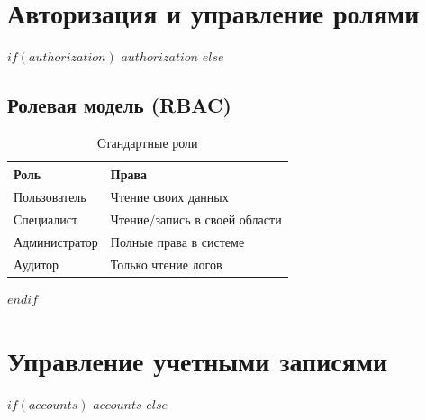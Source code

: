\documentclass[14pt,a4paper]{extarticle}
\begin{document}
\section{Авторизация и управление ролями}
\label{sec:authorization}

$if(authorization)$
$authorization$
$else$
\subsection{Ролевая модель (RBAC)}
\begin{table}[h]
\centering
\caption{Стандартные роли}
\begin{tabular}{|l|l|}
\hline
\textbf{Роль} & \textbf{Права} \\
\hline
Пользователь & Чтение своих данных \\
Специалист & Чтение/запись в своей области \\
Администратор & Полные права в системе \\
Аудитор & Только чтение логов \\
\hline
\end{tabular}
\end{table}
$endif$

\section{Управление учетными записями}
\label{sec:accounts}

$if(accounts)$
$accounts$
$else$
\end{document}
